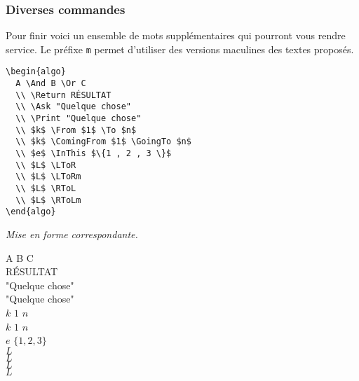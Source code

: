 \documentclass[12pt,a4paper]{article}
\begin{document}
\subsubsection{Diverses commandes}

Pour finir voici un ensemble de mots supplémentaires qui pourront vous rendre service. Le préfixe \verb+m+ permet d'utiliser des versions maculines des textes proposés.


\begin{multicols}{2}
    \centering
    \begin{frame-gene}
\begin{verbatim}
\begin{algo}
  A \And B \Or C
  \\ \Return RÉSULTAT
  \\ \Ask "Quelque chose"
  \\ \Print "Quelque chose"
  \\ $k$ \From $1$ \To $n$
  \\ $k$ \ComingFrom $1$ \GoingTo $n$
  \\ $e$ \InThis $\{1 , 2 , 3 \}$
  \\ $L$ \LToR
  \\ $L$ \LToRm
  \\ $L$ \RToL
  \\ $L$ \RToLm
\end{algo}
\end{verbatim}
    \end{frame-gene}
    \vfill\null
    \columnbreak
    \textit{Mise en forme correspondante.}
\begin{algo}
  A \And B \Or C
  \\ \Return RÉSULTAT
  \\ \Ask "Quelque chose"
  \\ \Print "Quelque chose"
  \\ $k$ \From $1$ \To $n$
  \\ $k$ \ComingFrom $1$ \GoingTo $n$
  \\ $e$ \InThis $\{1 , 2 , 3 \}$
  \\ $L$ \LToR
  \\ $L$ \LToRm
  \\ $L$ \RToL
  \\ $L$ \RToLm
\end{algo}
    \vfill\null
\end{multicols}




\end{document}

